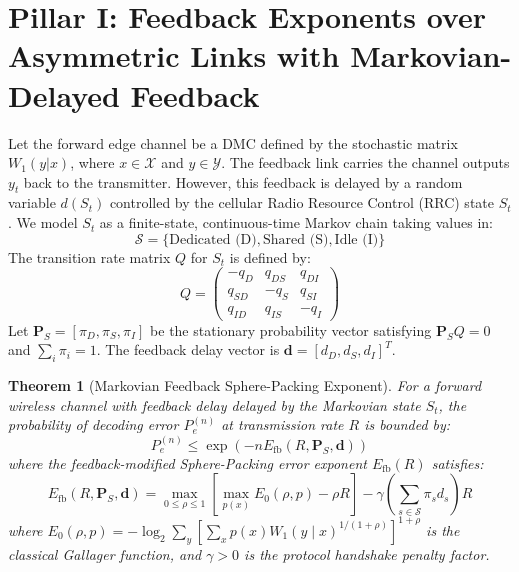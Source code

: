 \documentclass[journal]{IEEEtran}
\begin{document}
\section{Pillar I: Feedback Exponents over Asymmetric Links with Markovian-Delayed Feedback}
Let the forward edge channel be a DMC defined by the stochastic matrix $W_1(y|x)$, where $x \in \mathcal{X}$ and $y \in \mathcal{Y}$. The feedback link carries the channel outputs $y_t$ back to the transmitter. However, this feedback is delayed by a random variable $d(S_t)$ controlled by the cellular Radio Resource Control (RRC) state $S_t$. We model $S_t$ as a finite-state, continuous-time Markov chain taking values in:
\begin{equation}
\mathcal{S} = \{\text{Dedicated (D)}, \text{Shared (S)}, \text{Idle (I)}\}
\end{equation}
The transition rate matrix $Q$ for $S_t$ is defined by:
\begin{equation}
Q = \begin{pmatrix} -q_{D} & q_{DS} & q_{DI} \\ q_{SD} & -q_{S} & q_{SI} \\ q_{ID} & q_{IS} & -q_{I} \end{pmatrix}
\end{equation}
Let $\mathbf{P}_S = [\pi_D, \pi_S, \pi_I]$ be the stationary probability vector satisfying $\mathbf{P}_S Q = 0$ and $\sum_i \pi_i = 1$. The feedback delay vector is $\mathbf{d} = [d_D, d_S, d_I]^T$.

\newtheorem{theorem}{Theorem}
\begin{theorem}[Markovian Feedback Sphere-Packing Exponent]
For a forward wireless channel with feedback delay delayed by the Markovian state $S_t$, the probability of decoding error $P_e^{(n)}$ at transmission rate $R$ is bounded by:
\begin{equation}
P_e^{(n)} \leq \exp\left( -n E_{\text{fb}}(R, \mathbf{P}_S, \mathbf{d}) \right)
\end{equation}
where the feedback-modified Sphere-Packing error exponent $E_{\text{fb}}(R)$ satisfies:
\begin{equation}
E_{\text{fb}}(R, \mathbf{P}_S, \mathbf{d}) = \max_{0 \leq \rho \leq 1} \left[ \max_{p(x)} E_0(\rho, p) - \rho R \right] - \gamma \left( \sum_{s \in \mathcal{S}} \pi_s d_s \right) R
\end{equation}
where $E_0(\rho, p) = -\log_2 \sum_{y} \left[ \sum_{x} p(x) W_1(y \mid x)^{1/(1+\rho)} \right]^{1+\rho}$ is the classical Gallager function, and $\gamma > 0$ is the protocol handshake penalty factor.
\end{theorem}
\end{document}
